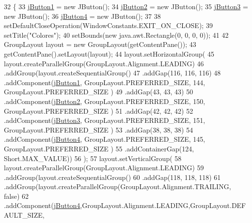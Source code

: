 \begin{DoxyCode}
32                                   \{
33         \mbox{\hyperlink{classlabprogavanzada_1_1_ventana_aaefd42529d112e472936e52efb94ae50}{jButton1}} = \textcolor{keyword}{new} JButton();
34         \mbox{\hyperlink{classlabprogavanzada_1_1_ventana_a33d2405f9bf4b2f5b095e92ad78de78d}{jButton2}} = \textcolor{keyword}{new} JButton();
35         \mbox{\hyperlink{classlabprogavanzada_1_1_ventana_af4bec17d2ee089325b41954139e9979b}{jButton3}} = \textcolor{keyword}{new} JButton();
36         \mbox{\hyperlink{classlabprogavanzada_1_1_ventana_a0eb30c9986200f02ee0e17f4c8bcecd1}{jButton4}} = \textcolor{keyword}{new} JButton();
37  
38         setDefaultCloseOperation(WindowConstants.EXIT\_ON\_CLOSE);
39         setTitle(\textcolor{stringliteral}{"Colores"});
40         setBounds(\textcolor{keyword}{new} java.awt.Rectangle(0, 0, 0, 0));
41  
42         GroupLayout layout = \textcolor{keyword}{new} GroupLayout(getContentPane());
43         getContentPane().setLayout(layout);
44         layout.setHorizontalGroup(
45             layout.createParallelGroup(GroupLayout.Alignment.LEADING)
46             .addGroup(layout.createSequentialGroup()
47                 .addGap(116, 116, 116)
48                 .addComponent(\mbox{\hyperlink{classlabprogavanzada_1_1_ventana_aaefd42529d112e472936e52efb94ae50}{jButton1}}, GroupLayout.PREFERRED\_SIZE, 144, GroupLayout.PREFERRED\_SIZE
      )
49                 .addGap(43, 43, 43)
50                 .addComponent(\mbox{\hyperlink{classlabprogavanzada_1_1_ventana_a33d2405f9bf4b2f5b095e92ad78de78d}{jButton2}}, GroupLayout.PREFERRED\_SIZE, 150, GroupLayout.PREFERRED\_SIZE
      )
51                 .addGap(42, 42, 42)
52                 .addComponent(\mbox{\hyperlink{classlabprogavanzada_1_1_ventana_af4bec17d2ee089325b41954139e9979b}{jButton3}}, GroupLayout.PREFERRED\_SIZE, 151, GroupLayout.PREFERRED\_SIZE
      )
53                 .addGap(38, 38, 38)
54                 .addComponent(\mbox{\hyperlink{classlabprogavanzada_1_1_ventana_a0eb30c9986200f02ee0e17f4c8bcecd1}{jButton4}}, GroupLayout.PREFERRED\_SIZE, 145, GroupLayout.PREFERRED\_SIZE
      )
55                 .addContainerGap(124, Short.MAX\_VALUE))
56         );
57         layout.setVerticalGroup(
58             layout.createParallelGroup(GroupLayout.Alignment.LEADING)
59             .addGroup(layout.createSequentialGroup()
60                 .addGap(118, 118, 118)
61                 .addGroup(layout.createParallelGroup(GroupLayout.Alignment.TRAILING, \textcolor{keyword}{false})
62                    .addComponent(\mbox{\hyperlink{classlabprogavanzada_1_1_ventana_a0eb30c9986200f02ee0e17f4c8bcecd1}{jButton4}},GroupLayout.Alignment.LEADING,GroupLayout.DEFAULT\_SIZE, 

\end{DoxyCode}
